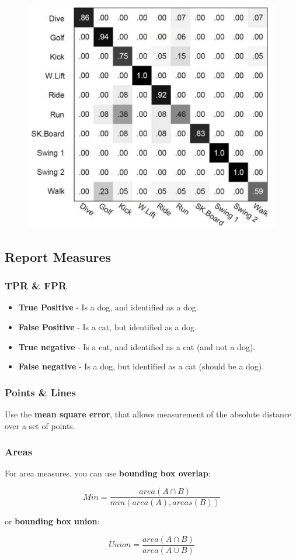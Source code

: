 \documentclass[english, 10pt]{article}
\begin{document}
\begin{figure}[ht!]      
	\centering 
	\includegraphics[scale=0.3]{confusion_matrix.png}
\end{figure}

\subsection{Report Measures}

\subsubsection{TPR \& FPR}

\begin{itemize}
\item \textbf{True Positive} - Is a dog, and identified as a dog. 
\item \textbf{False Positive} - Is a cat, but identified as a dog. 
\item \textbf{True negative} - Is a cat, and identified as a cat (and not a dog).
\item \textbf{False negative} - Is a dog, but identified as a cat (should be a dog).
\end{itemize}

\subsubsection{Points \& Lines}

Use the \textbf{mean square error}, that allows measurement of the absolute distance over a set of points. 

\subsubsection{Areas}

For area measures, you can use \textbf{bounding box overlap}:

$$Min = \frac{area(A \cap B)}{min(area(A), areas(B))}$$

or \textbf{bounding box union}:

$$Union = \frac{area(A \cap B)}{area(A \cup B)}$$
\end{document}
